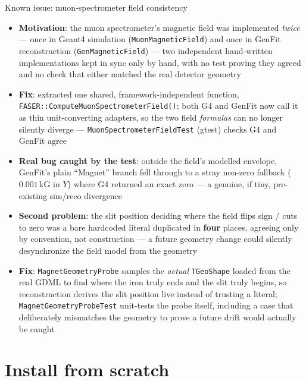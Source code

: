 \documentclass[aspectratio=169]{beamer}
\begin{document}
\begin{frame}{Known issue: muon-spectrometer field consistency}
  \footnotesize
  \begin{itemize}
    \item \textbf{Motivation}: the muon spectrometer's magnetic field was
      implemented \emph{twice} --- once in Geant4 simulation
      (\texttt{MuonMagneticField}) and once in GenFit reconstruction
      (\texttt{GenMagneticField}) --- two independent hand-written
      implementations kept in sync only by hand, with no test proving they
      agreed and no check that either matched the real detector geometry
    \item \textbf{Fix}: extracted one shared, framework-independent
      function, \texttt{FASER::ComputeMuonSpectrometerField()}; both G4 and
      GenFit now call it as thin unit-converting adapters, so the two field
      \emph{formulas} can no longer silently diverge ---
      \texttt{MuonSpectrometerFieldTest} (gtest) checks G4 and GenFit agree
    \item \textbf{Real bug caught by the test}: outside the field's
      modelled envelope, GenFit's plain ``Magnet'' branch fell through to a
      stray non-zero fallback ($0.001$\,kG in $Y$) where G4 returned an
      exact zero --- a genuine, if tiny, pre-existing sim/reco divergence
    \item \textbf{Second problem}: the slit position deciding where the
      field flips sign / cuts to zero was a bare hardcoded literal
      duplicated in \textbf{four} places, agreeing only by convention, not
      construction --- a future geometry change could silently
      desynchronize the field model from the geometry
    \item \textbf{Fix}: \texttt{MagnetGeometryProbe} samples the
      \emph{actual} \texttt{TGeoShape} loaded from the real GDML to find
      where the iron truly ends and the slit truly begins, so
      reconstruction derives the slit position live instead of trusting a
      literal; \texttt{MagnetGeometryProbeTest} unit-tests the probe
      itself, including a case that deliberately mismatches the geometry
      to prove a future drift would actually be caught
  \end{itemize}
\end{frame}

\section{Install from scratch}
\end{document}
